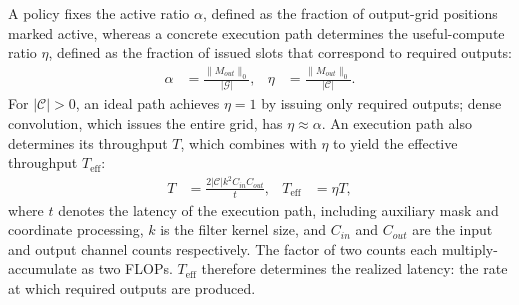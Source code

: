 A policy fixes the active ratio $\alpha$, defined as the fraction of output-grid positions marked active, whereas a concrete execution path determines the useful-compute ratio $\eta$, defined as the fraction of issued slots that correspond to required outputs:
\begin{equation}
  \begin{aligned}
    \alpha &= \frac{\|M_{out}\|_0}{|\mathcal{G}|},
    & \eta &= \frac{\|M_{out}\|_0}{|\mathcal{C}|}.
  \end{aligned}
  \label{eq:efficiency-framework}
\end{equation}
For $|\mathcal{C}|>0$, an ideal path achieves $\eta=1$ by issuing only required outputs; dense convolution, which issues the entire grid, has $\eta\approx\alpha$. An execution path also determines its throughput $T$, which combines with $\eta$ to yield the effective throughput $T_{\mathrm{eff}}$:
\begin{equation}
  \begin{aligned}
    T &= \frac{2|\mathcal{C}|k^2 C_{in} C_{out}}{t},
    & T_{\mathrm{eff}} &= \eta T,
  \end{aligned}
  \label{eq:efficiency-framework-throughput}
\end{equation}
where \(t\) denotes the latency of the execution path, including auxiliary mask and coordinate processing, \(k\) is the filter kernel size, and \(C_{in}\) and \(C_{out}\) are the input and output channel counts respectively. The factor of two counts each multiply-accumulate as two FLOPs. \(T_{\mathrm{eff}}\) therefore determines the realized latency: the rate at which required outputs are produced.




